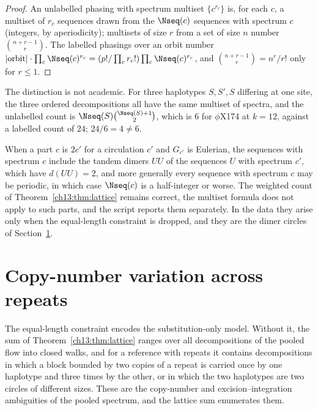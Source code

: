 \begin{proof}
An unlabelled phasing with spectrum multiset $\{c^{r_c}\}$ is, for each $c$, a multiset of
$r_c$ sequences drawn from the $\Nseq(c)$ sequences with spectrum $c$ (integers, by
aperiodicity); multisets of size $r$ from a set of size $n$ number $\binom{n+r-1}{r}$. The
labelled phasings over an orbit number $|{\rm orbit}|\cdot\prod_c\Nseq(c)^{r_c}=
(p!/\prod_c r_c!)\prod_c\Nseq(c)^{r_c}$, and $\binom{n+r-1}{r}=n^r/r!$ only for $r\le1$.
\end{proof}

The distinction is not academic. For three haplotypes $S,S',S$ differing at one site, the
three ordered decompositions all have the same multiset of spectra, and the unlabelled count is
$\Nseq(S)\binom{\Nseq(S)+1}{2}$, which is $6$ for $\phi$X174 at $k=12$, against a labelled
count of $24$; $24/6=4\ne6$.

\begin{remark}\label{ch13:rem:periodic}
When a part $c$ is $2c'$ for a circulation $c'$ and $G_{c'}$ is Eulerian, the sequences with
spectrum $c$ include the tandem dimers $UU$ of the sequences $U$ with spectrum $c'$, which
have $d(UU)=2$, and more generally every sequence with spectrum $c$ may be periodic, in which
case $\Nseq(c)$ is a half-integer or worse. The weighted count of Theorem~\ref{ch13:thm:lattice}
remains correct, the multiset formula does not apply to such parts, and the script reports
them separately. In the data they arise only when the equal-length constraint is dropped, and
they are the dimer circles of Section~\ref{ch13:sec:cnv}.
\end{remark}

\section{Copy-number variation across repeats}\label{ch13:sec:cnv}

The equal-length constraint encodes the substitution-only model. Without it, the sum of
Theorem~\ref{ch13:thm:lattice} ranges over all decompositions of the pooled flow into closed walks,
and for a reference with repeats it contains decompositions in which a block bounded by two
copies of a repeat is carried once by one haplotype and three times by the other, or in which
the two haplotypes are two circles of different sizes. These are the copy-number and
excision--integration ambiguities of the pooled spectrum, and the lattice sum enumerates them.

